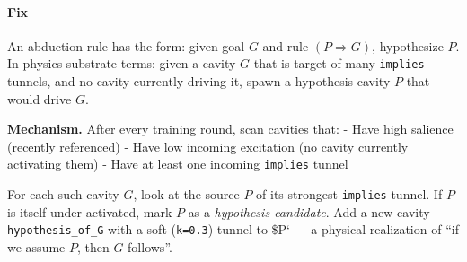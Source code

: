 \documentclass[
  11pt,
  a4paper,
]{article}
\begin{document}
\paragraph{Fix}\label{fix-6}

An abduction rule has the form: given goal \(G\) and rule
\((P \Rightarrow G)\), hypothesize \(P\). In physics-substrate terms:
given a cavity \(G\) that is target of many \texttt{implies} tunnels,
and no cavity currently driving it, spawn a hypothesis cavity \(P\) that
would drive \(G\).

\textbf{Mechanism.} After every training round, scan cavities that: -
Have high salience (recently referenced) - Have low incoming excitation
(no cavity currently activating them) - Have at least one incoming
\texttt{implies} tunnel

For each such cavity \(G\), look at the source \(P\) of its strongest
\texttt{implies} tunnel. If \(P\) is itself under-activated, mark \(P\)
as a \emph{hypothesis candidate}. Add a new cavity
\texttt{hypothesis\_of\_G} with a soft (\texttt{k=0.3}) tunnel to \$P`
--- a physical realization of ``if we assume \(P\), then \(G\)
follows''.
\end{document}
